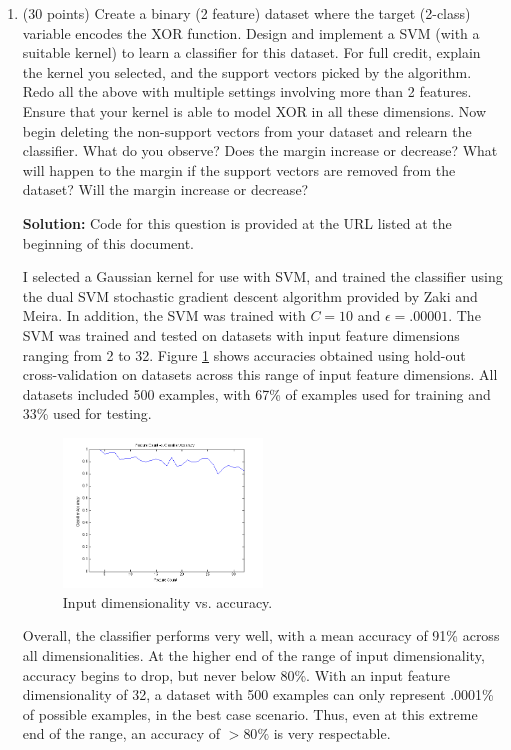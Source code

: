 \documentclass[11pt]{article}
\begin{document}
\begin{enumerate}
\begin{enumerate}
\end{enumerate}

\item (30 points) Create a binary (2 feature) dataset where the target (2-class) variable encodes the XOR function. Design and implement a SVM (with a suitable kernel) to learn a classifier for this dataset. For full credit, explain the kernel you selected, and the support vectors picked by the algorithm. Redo all the above with multiple settings involving more than 2 features. Ensure that your kernel is able to model XOR in all these dimensions. Now begin deleting the non-support vectors from your dataset and relearn the classifier. What do you observe? Does the margin increase or decrease? What will happen to the margin if the support vectors are removed from the dataset? Will the margin increase or decrease?

\textbf{Solution:} Code for this question is provided at the URL listed at the beginning of this document.

I selected a Gaussian kernel for use with SVM, and trained the classifier using the dual SVM stochastic gradient descent algorithm provided by Zaki and Meira. In addition, the SVM was trained with $C = 10$ and $\epsilon = .00001$. The SVM was trained and tested on datasets with input feature dimensions ranging from 2 to 32. Figure \ref{fig:features_vs_accuracy} shows accuracies obtained using hold-out cross-validation on datasets across this range of input feature dimensions. All datasets included 500 examples, with 67\% of examples used for training and 33\% used for testing.

\begin{figure}[H]
    \centering
    \includegraphics[width=0.5\textwidth]{features_vs_accuracy.png}
    \caption{Input dimensionality vs. accuracy.}
    \label{fig:features_vs_accuracy}
\end{figure}

Overall, the classifier performs very well, with a mean accuracy of 91\% across all dimensionalities. At the higher end of the range of input dimensionality, accuracy begins to drop, but never below 80\%. With an input feature dimensionality of 32, a dataset with 500 examples can only represent .0001\% of possible examples, in the best case scenario. Thus, even at this extreme end of the range, an accuracy of $> 80\%$ is very respectable.


\end{enumerate}
\end{document}
